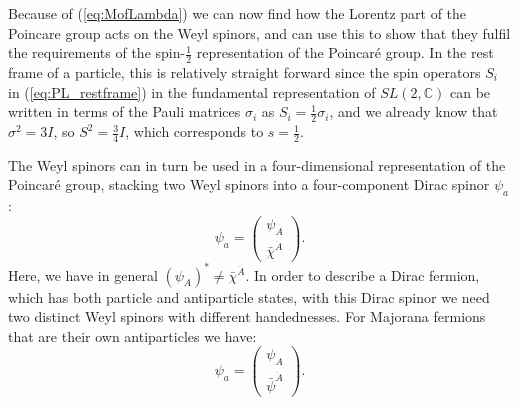 \documentclass[notes.tex]{subfiles}
\begin{document}
Because of (\ref{eq:MofLambda}) we can now find how the Lorentz part of the Poincare group acts on the Weyl spinors, and can use this to show that they fulfil the requirements of the spin-$\frac{1}{2}$ representation of the Poincaré group. In the rest frame of a particle, this is relatively straight forward since the spin operators $S_i$ in (\ref{eq:PL_restframe}) in the fundamental representation of $SL(2,\mathbb{C})$ can be written in terms of the Pauli matrices $\sigma_i$ as $S_i=\frac{1}{2}\sigma_i$, and we already know that $\sigma^2=3I$, so $S^2=\frac{3}{4}I$, which corresponds to $s=\frac{1}{2}$.

The Weyl spinors can in turn be used in a four-dimensional representation of the Poincaré group, stacking two Weyl spinors into a four-component Dirac spinor $\psi_a$:
\begin{equation*}
\psi_a = \begin{pmatrix}\psi_A\\ \bar{\chi}^{\dot{A}}\end{pmatrix}.
\end{equation*}
Here, we have in general $(\psi_A)^* \neq \bar{\chi}^{\dot{A}}$. In order to describe a Dirac fermion, which has both particle and antiparticle states, with this Dirac spinor we need two distinct Weyl spinors with different handednesses. For Majorana fermions that are their own antiparticles we have:
\[\psi_a = \begin{pmatrix} \psi_A \\ \bar{\psi}^{\dot{A}}\end{pmatrix}.\]


\end{document}
